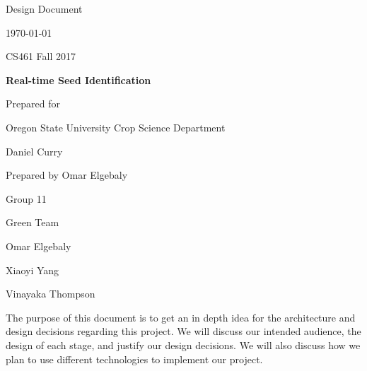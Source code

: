 \documentclass[onecolumn, draftclsnofoot,10pt, compsoc]{IEEEtran}
\def \CapstoneTeamName{			Green Team}
\def \CapstoneTeamNumber{		11}
\def \GroupMemberOne{			Omar Elgebaly}
\def \GroupMemberTwo{			Xiaoyi Yang}
\def \GroupMemberThree{			Vinayaka Thompson}
\def \CapstoneProjectName{		Real-time Seed Identification}
\def \CapstoneSponsorCompany{	Oregon State University Crop Science Department}
\def \CapstoneSponsorPerson{	Daniel Curry}
\newcommand{\NameSigPair}[1]{\par
\makebox[2.75in][r]{#1} \hfil 	\makebox[3.25in]{\makebox[2.25in]{\hrulefill} \hfill		\makebox[.75in]{\hrulefill}}
\par\vspace{-12pt} \textit{\tiny\noindent
\makebox[2.75in]{} \hfil		\makebox[3.25in]{\makebox[2.25in][r]{Signature} \hfill	\makebox[.75in][r]{Date}}}}
\renewcommand{\NameSigPair}[1]{#1}
\begin{document}
\begin{titlepage}
    \begin{singlespace}
        \hfill 
        \par\vspace{.2in}
        \centering
        \scshape{
            \huge Design Document \par
            {\large\today}\par
			{\large CS461 Fall 2017}\par
            \vspace{.5in}
            \textbf{\Huge\CapstoneProjectName}\par
            \vfill
            {\large Prepared for}\par
            \Huge \CapstoneSponsorCompany\par
            \vspace{5pt}
            {\Large\NameSigPair{\CapstoneSponsorPerson}\par}
            {\large Prepared by Omar Elgebaly}\par
            Group\CapstoneTeamNumber\par
            \CapstoneTeamName\par 
            \vspace{5pt}
            {\Large
                \NameSigPair{\GroupMemberOne}\par
                \NameSigPair{\GroupMemberTwo}\par
                \NameSigPair{\GroupMemberThree}\par
            }
            \vspace{20pt}
        }
        \begin{abstract}




        \end{abstract}     
    The purpose of this document is to get an in depth idea for the architecture and design decisions regarding this project. We will discuss our intended audience, the design of each stage, and justify our design decisions. We will also discuss how we plan to use different technologies to implement our project.
    \end{singlespace}
\end{titlepage}
\newpage
{}
\tableofcontents
\clearpage
\end{document}
